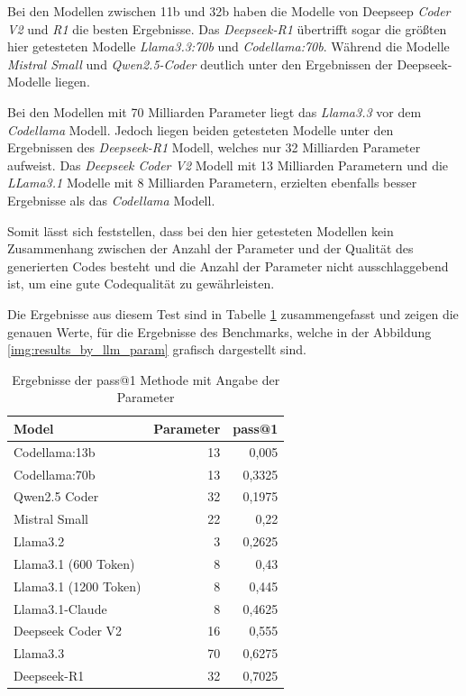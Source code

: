 Bei den Modellen zwischen 11b und 32b haben die Modelle von Deepseep \textit{Coder V2} und \textit{R1} die besten Ergebnisse. Das \textit{Deepseek-R1} übertrifft sogar die größten hier getesteten Modelle \textit{Llama3.3:70b} und \textit{Codellama:70b}. Während die Modelle \textit{Mistral Small} und \textit{Qwen2.5-Coder} deutlich unter den Ergebnissen der Deepseek-Modelle liegen.\vspace{0.2cm}

Bei den Modellen mit 70 Milliarden Parameter liegt das \textit{Llama3.3} vor dem \textit{Codellama} Modell. Jedoch liegen beiden getesteten Modelle unter den Ergebnissen des \textit{Deepseek-R1} Modell, welches nur 32 Milliarden Parameter aufweist. Das \textit{Deepseek Coder V2} Modell mit 13 Milliarden Parametern und die \textit{LLama3.1} Modelle mit 8 Milliarden Parametern, erzielten ebenfalls besser Ergebnisse als das \textit{Codellama} Modell.\vspace{0.2cm}

Somit lässt sich feststellen, dass bei den hier getesteten Modellen kein Zusammenhang zwischen der Anzahl der Parameter und der Qualität des generierten Codes besteht und die Anzahl der Parameter nicht ausschlaggebend ist, um eine gute Codequalität zu gewährleisten.\vspace{0.2cm}

Die Ergebnisse aus diesem Test sind in Tabelle \ref{tab:prompt_results_open_models_by_param} zusammengefasst und zeigen die genauen Werte, für die Ergebnisse des Benchmarks, welche in der Abbildung \ref{img:results_by_llm_param} grafisch dargestellt sind.

\begin{table}[!ht]
	\begin{tabular}{|l|r|r|}
		\hline
		\textbf{Model} & \textbf{Parameter} & \textbf{pass@1} \\
		\hline
		Codellama:13b         & 13 &  0,005 \\
		Codellama:70b         & 13 & 0,3325 \\
		Qwen2.5 Coder         & 32 & 0,1975 \\
		Mistral Small         & 22 &   0,22 \\
		Llama3.2              &  3 & 0,2625 \\
		Llama3.1 (600 Token)  &  8 &   0,43 \\
		Llama3.1 (1200 Token) &  8 &  0,445 \\
		Llama3.1-Claude       &  8 & 0,4625 \\
		Deepseek Coder V2     & 16 &  0,555 \\
		Llama3.3              & 70 & 0,6275 \\
		Deepseek-R1           & 32 & 0,7025 \\
		\hline
		\hline
	\end{tabular}
	\centering
	\label{tab:prompt_results_open_models_by_param}
	\caption{Ergebnisse der pass@1 Methode mit Angabe der Parameter}
\end{table}

